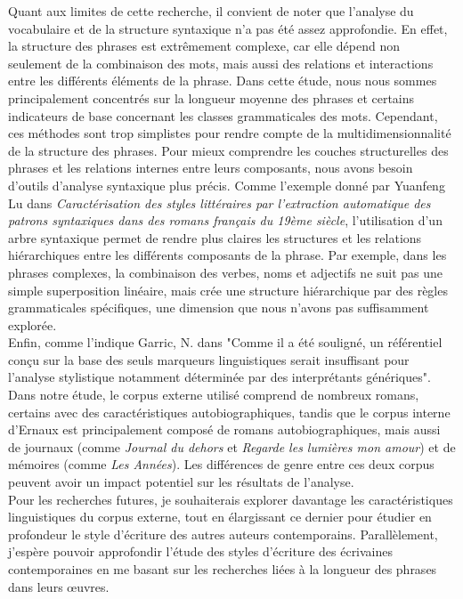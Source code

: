 Quant aux limites de cette recherche, il convient de noter que l’analyse du vocabulaire et de la structure syntaxique n’a pas été assez approfondie. En effet, la structure des phrases est extrêmement complexe, car elle dépend non seulement de la combinaison des mots, mais aussi des relations et interactions entre les différents éléments de la phrase. Dans cette étude, nous nous sommes principalement concentrés sur la longueur moyenne des phrases et certains indicateurs de base concernant les classes grammaticales des mots. Cependant, ces méthodes sont trop simplistes pour rendre compte de la multidimensionnalité de la structure des phrases. Pour mieux comprendre les couches structurelles des phrases et les relations internes entre leurs composants, nous avons besoin d'outils d'analyse syntaxique plus précis. Comme l'exemple donné par Yuanfeng Lu dans \cite{lu2021caracterisation}\textit{Caractérisation des styles littéraires par l'extraction automatique des patrons syntaxiques dans des romans français du 19ème siècle}, l'utilisation d'un arbre syntaxique permet de rendre plus claires les structures et les relations hiérarchiques entre les différents composants de la phrase. Par exemple, dans les phrases complexes, la combinaison des verbes, noms et adjectifs ne suit pas une simple superposition linéaire, mais crée une structure hiérarchique par des règles grammaticales spécifiques, une dimension que nous n'avons pas suffisamment explorée.\\

Enfin, comme l’indique Garric, N. dans \cite{garric2011vers} "Comme il a été souligné, un référentiel conçu sur la base des seuls marqueurs linguistiques serait insuffisant pour l’analyse stylistique notamment déterminée par des interprétants génériques". Dans notre étude, le corpus externe utilisé comprend de nombreux romans, certains avec des caractéristiques autobiographiques, tandis que le corpus interne d'Ernaux est principalement composé de romans autobiographiques, mais aussi de journaux (comme \textit{Journal du dehors} et \textit{Regarde les lumières mon amour}) et de mémoires (comme \textit{Les Années}). Les différences de genre entre ces deux corpus peuvent avoir un impact potentiel sur les résultats de l’analyse.\\


Pour les recherches futures, je souhaiterais explorer davantage les caractéristiques linguistiques du corpus externe, tout en élargissant ce dernier pour étudier en profondeur le style d'écriture des autres auteurs contemporains. Parallèlement, j’espère pouvoir approfondir l’étude des styles d’écriture des écrivaines contemporaines en me basant sur les recherches liées à la longueur des phrases dans leurs œuvres.

